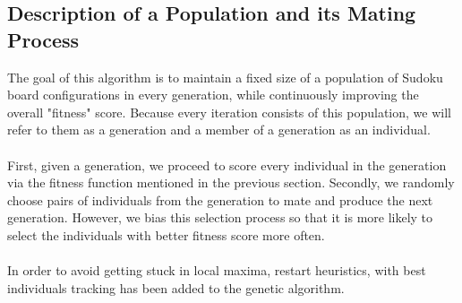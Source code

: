 \documentclass[12pt, a4paper]{article}
\begin{document}
		\subsection{Description of a Population and its Mating Process}
			The goal of this algorithm is to maintain a fixed size of a population of Sudoku board configurations in every generation, while continuously improving the overall "fitness" score. Because every iteration consists of this population, we will refer to them as a generation and a member of a generation as an individual.\\\\
			First, given a generation, we proceed to score every individual in the generation via the fitness function mentioned in the previous section. Secondly, we randomly choose pairs of individuals from the generation to mate and produce the next generation. However, we bias this selection process so that it is more likely to select the individuals with better fitness score more often.\\\\
			In order to avoid getting stuck in local maxima, restart heuristics, with best individuals tracking has been added to the genetic algorithm.
\end{document}
